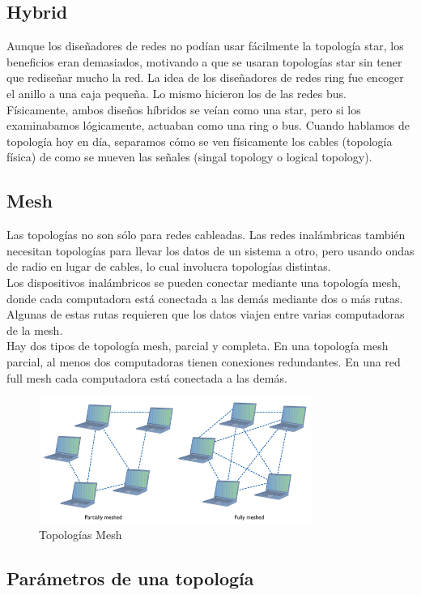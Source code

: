 \documentclass[12pt]{report}
\begin{document}
\subsection{Hybrid}
Aunque los diseñadores de redes no podían usar fácilmente la topología star, 
los beneficios eran demasiados, motivando a que se usaran topologías star sin 
tener que rediseñar mucho la red. La idea de los diseñadores de redes ring fue
encoger el anillo a una caja pequeña. Lo mismo hicieron los de las redes bus.\\
Físicamente, ambos diseños híbridos se veían como una star, pero si los examinabamos
lógicamente, actuaban como una ring o bus. Cuando hablamos de topología hoy en día, 
separamos cómo se ven físicamente los cables (topología física) de como 
se mueven las señales (singal topology o logical topology).


\subsection{Mesh}
Las topologías no son sólo para redes cableadas. Las redes inalámbricas también 
necesitan topologías para llevar los datos de un sistema a otro, pero usando
ondas de radio en lugar de cables, lo cual involucra topologías distintas.\\
Los dispositivos inalámbricos se pueden conectar mediante una topología mesh, 
donde cada computadora está conectada a las demás mediante dos o más rutas.
Algunas de estas rutas requieren que los datos viajen entre varias computadoras 
de la mesh.\\
Hay dos tipos de topología mesh, parcial y completa. En una topología mesh parcial, 
al menos dos computadoras tienen conexiones redundantes. En una red full mesh cada computadora 
está conectada a las demás.

\begin{figure}[h]
\centering
\includegraphics[width=0.8\textwidth]{Mesh.jpg}
\caption{Topologías Mesh}
\end{figure}

\subsection{Parámetros de una topología}
\end{document}
